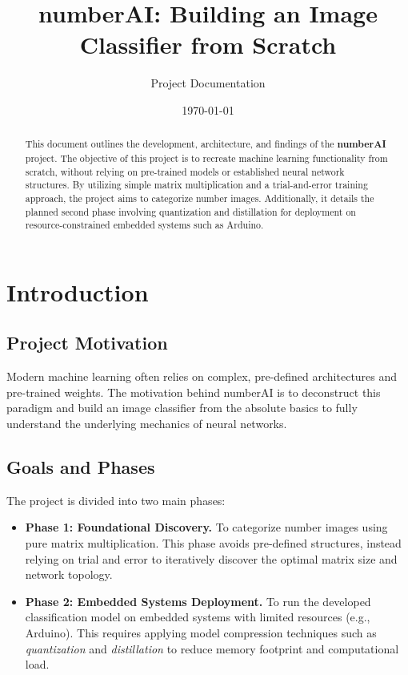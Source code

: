 \documentclass[12pt,a4paper]{article}
\title{numberAI: Building an Image Classifier from Scratch}
\author{Project Documentation}
\date{\today}
\begin{document}
\maketitle

\begin{abstract}
    This document outlines the development, architecture, and findings of the \textbf{numberAI} project. The objective of this project is to recreate machine learning functionality from scratch, without relying on pre-trained models or established neural network structures. By utilizing simple matrix multiplication and a trial-and-error training approach, the project aims to categorize number images. Additionally, it details the planned second phase involving quantization and distillation for deployment on resource-constrained embedded systems such as Arduino.
\end{abstract}

\tableofcontents
\newpage

\section{Introduction}
\subsection{Project Motivation}
Modern machine learning often relies on complex, pre-defined architectures and pre-trained weights. The motivation behind numberAI is to deconstruct this paradigm and build an image classifier from the absolute basics to fully understand the underlying mechanics of neural networks.

\subsection{Goals and Phases}
The project is divided into two main phases:
\begin{itemize}
    \item \textbf{Phase 1: Foundational Discovery.} To categorize number images using pure matrix multiplication. This phase avoids pre-defined structures, instead relying on trial and error to iteratively discover the optimal matrix size and network topology.
    \item \textbf{Phase 2: Embedded Systems Deployment.} To run the developed classification model on embedded systems with limited resources (e.g., Arduino). This requires applying model compression techniques such as \textit{quantization} and \textit{distillation} to reduce memory footprint and computational load.
\end{itemize}
\end{document}
